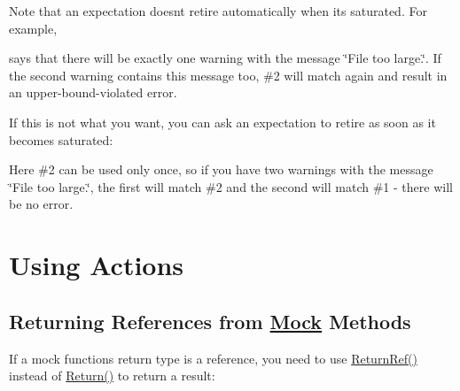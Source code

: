 Note that an expectation doesn\textquotesingle{}t retire automatically when it\textquotesingle{}s saturated. For example,


\begin{DoxyCode}{0}
\end{DoxyCode}


says that there will be exactly one warning with the message {\ttfamily \char`\"{}\+File
too large.\char`\"{}}. If the second warning contains this message too, \#2 will match again and result in an upper-\/bound-\/violated error.

If this is not what you want, you can ask an expectation to retire as soon as it becomes saturated\+:


\begin{DoxyCode}{0}
\end{DoxyCode}


Here \#2 can be used only once, so if you have two warnings with the message {\ttfamily \char`\"{}\+File too large.\char`\"{}}, the first will match \#2 and the second will match \#1 -\/ there will be no error.

\section*{Using Actions}

\subsection*{Returning References from \mbox{\hyperlink{class_mock}{Mock}} Methods}

If a mock function\textquotesingle{}s return type is a reference, you need to use {\ttfamily \mbox{\hyperlink{namespacetesting_ac17089d5ca6377944d3792fbdc5c5d9b}{Return\+Ref()}}} instead of {\ttfamily \mbox{\hyperlink{namespacetesting_adae3994eb444d1ad2dd602454b854663}{Return()}}} to return a result\+:


\begin{DoxyCode}{0}
\DoxyCodeLine{}
\DoxyCodeLine{\};}
\DoxyCodeLine{}
\end{DoxyCode}


